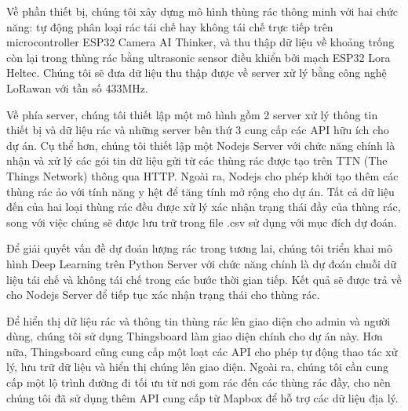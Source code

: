 


Về phần thiết bị, chúng tôi xây dựng mô hình thùng rác thông minh với hai chức năng: tự động phân loại rác tái chế hay không tái chế trực tiếp trên microcontroller ESP32 Camera AI Thinker, và thu thập dữ liệu về khoảng trống còn lại trong thùng rác bằng ultrasonic sensor điều khiển bởi mạch ESP32 Lora Heltec. Chúng tôi sẽ đưa dữ liệu thu thập được về server xử lý bằng công nghệ LoRawan với tần số  433MHz.

Về phía server, chúng tôi thiết lập một mô hình gồm 2 server xử lý thông tin thiết bị và dữ liệu rác và những server bên thứ 3 cung cấp các API hữu ích cho dự án. Cụ thể hơn, chúng tôi thiết lập một Nodejs Server với chức năng chính là nhận và xử lý các gói tin dữ liệu gửi từ các thùng rác được tạo trên TTN (The Things Network) thông qua HTTP. Ngoài ra, Nodejs cho phép khởi tạo thêm các thùng rác ảo với tính năng y hệt để tăng tính mở rộng cho dự án. Tất cả dữ liệu đến của hai loại thùng rác đều được xử lý xác nhận trạng thái đầy của thùng rác, song với việc chúng sẽ được lưu trữ trong file .csv sử dụng với mục đích dự đoán.

Để giải quyết vấn đề dự đoán lượng rác trong tương lai, chúng tôi triển khai mô hình Deep Learning trên Python Server với chức năng chính là dự đoán chuỗi dữ liệu tái chế và không tái chế trong các bước thời gian tiếp. Kết quả sẽ được trả về cho Nodejs Server để tiếp tục xác nhận trạng thái cho thùng rác.

Để hiển thị dữ liệu rác và thông tin thùng rác lên giao diện cho admin và người dùng, chúng tôi sử dụng Thingsboard làm giao diện chính cho dự án này. Hơn nữa, Thingsboard cũng cung cấp một loạt các API cho phép tự động thao tác xử lý, lưu trữ dữ liệu và hiển thị chúng lên giao diện. Ngoài ra, chúng tôi cần cung cấp một lộ trình đường đi tối ưu từ nơi gom rác đến các thùng rác đầy, cho nên chúng tôi đã sử dụng thêm API cung cấp từ Mapbox để hỗ trợ các dữ liệu địa lý.